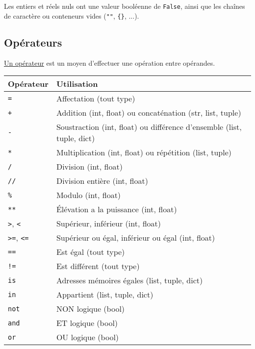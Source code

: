 \documentclass{article}
\begin{document}
Les entiers et réels nuls ont une valeur booléenne de \texttt{False}, ainsi que les chaînes de caractère ou conteneurs vides (\texttt{""}, \texttt{\{\}}, ...).

\subsection*{Opérateurs}
\href{https://fr.wikibooks.org/wiki/Programmation_Python/Op\%C3\%A9rateurs}{Un opérateur} est un moyen d'effectuer une opération entre opérandes.

\begin{tabular}{|l|l|}
    \hline
    Opérateur   & Utilisation\\
    \hline
    \texttt{=}                      & Affectation (tout type)\\
    \texttt{+}                      & Addition (int, float) ou concaténation (str, list, tuple)\\
    \texttt{-}                      & Soustraction (int, float) ou différence d'ensemble (list, tuple, dict)\\
    \texttt{*}                      & Multiplication (int, float) ou répétition (list, tuple)\\
    \texttt{/}                      & Division (int, float)\\
    \texttt{//}                     & Division entière (int, float)\\
    \texttt{\%}                     & Modulo (int, float)\\
    \texttt{**}                     & Élévation a la puissance (int, float)\\
    \texttt{>}, \texttt{<}          & Supérieur, inférieur (int, float)\\
    \texttt{>=}, \texttt{<=}        & Supérieur ou égal, inférieur ou égal (int, float)\\
    \texttt{==}                     & Est égal (tout type)\\
    \texttt{!=}                     & Est différent (tout type)\\
    \texttt{is}                     & Adresses mémoires égales (list, tuple, dict)\\
    \texttt{in}                     & Appartient (list, tuple, dict)\\
    \texttt{not}                    & NON logique (bool)\\
    \texttt{and}                    & ET logique (bool)\\
    \texttt{or}                     & OU logique (bool)\\

\end{tabular}
\end{document}
